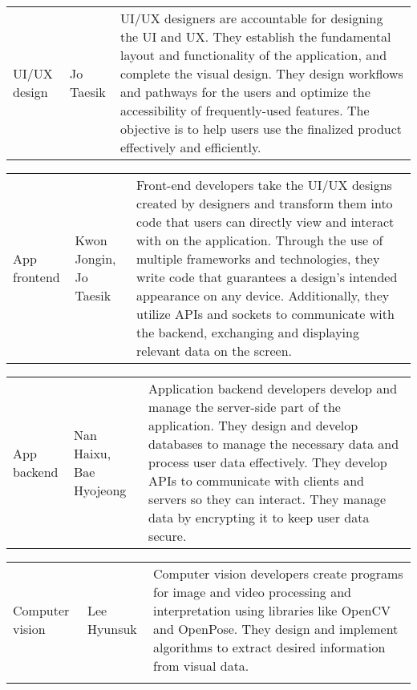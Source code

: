 \begin{enumerate}[label=\arabic*]
          \begin{table}[H]
              \center
              \begin{tabular}{m{1.4cm} m{1.5cm} m{4cm}}
                  UI/UX design & Jo Taesik & UI/UX designers are accountable for designing the UI and UX. They establish the fundamental layout and functionality of the application, and complete the visual design. They design workflows and pathways for the users and optimize the accessibility of frequently-used features. The objective is to help users use the finalized product effectively and efficiently. \\
              \end{tabular}
          \end{table}

          \begin{table}[H]
              \center
              \begin{tabular}{m{1.4cm} m{1.5cm} m{4cm}}
                  App frontend & Kwon Jongin, Jo Taesik & Front-end developers take the UI/UX designs created by designers and transform them into code that users can directly view and interact with on the application. Through the use of multiple frameworks and technologies, they write code that guarantees a design’s intended appearance on any device. Additionally, they utilize APIs and sockets to communicate with the backend, exchanging and displaying relevant data on the screen. \\
              \end{tabular}
          \end{table}

          \begin{table}[H]
              \center
              \begin{tabular}{m{1.4cm} m{1.5cm} m{4cm}}
                  App backend & Nan Haixu, Bae Hyojeong & Application backend developers develop and manage the server-side part of the application. They design and develop databases to manage the necessary data and process user data effectively. They develop APIs to communicate with clients and servers so they can interact. They manage data by encrypting it to keep user data secure. \\
              \end{tabular}
          \end{table}

          \begin{table}[H]
              \center
              \begin{tabular}{m{1.4cm} m{1.5cm} m{4cm}}
                  Computer vision & Lee Hyunsuk & Computer vision developers create programs for image and video processing and interpretation using libraries like OpenCV and OpenPose. They design and implement algorithms to extract desired information from visual data. \\\\
                  \bottomrule
              \end{tabular}
          \end{table}


\end{enumerate}
